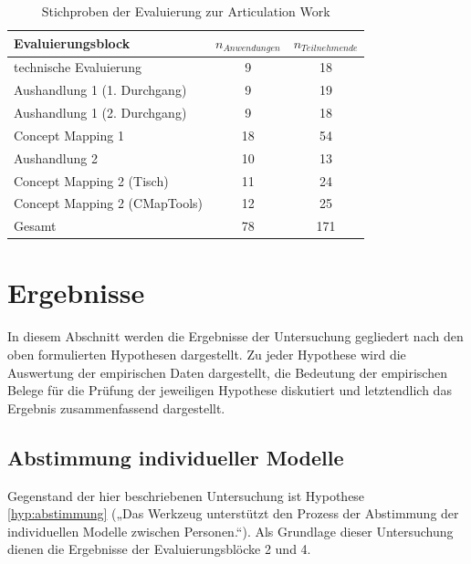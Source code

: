 \begin{table}[htbp]
	\centering
	\caption{Stichproben der Evaluierung zur Articulation Work}

		\begin{tabular}{| l || c | c |}
		\hline
			Evaluierungsblock & $n_{Anwendungen}$ & $n_{Teilnehmende}$ \\ \hline
			technische Evaluierung		  &  9 & 18 \\
			Aushandlung 1 (1. Durchgang)  &  9 & 19 \\
			Aushandlung 1 (2. Durchgang)  &  9 & 18 \\
			Concept Mapping 1			  & 18 & 54 \\
			Aushandlung 2				  & 10 & 13 \\
			Concept Mapping 2 (Tisch)     & 11 & 24 \\
			Concept Mapping 2 (CMapTools) & 12 & 25 \\ \hline
			Gesamt						  & 78 & 171 \\ \hline
	\end{tabular}
	\label{tab:stichprobe_aw}
\end{table}


\section{Ergebnisse} %
\label{sec:a_ergebnisse}

In diesem Abschnitt werden die Ergebnisse der Untersuchung gegliedert nach den oben formulierten Hypothesen dargestellt. Zu jeder Hypothese wird die Auswertung der empirischen Daten dargestellt, die Bedeutung der empirischen Belege für die Prüfung der jeweiligen Hypothese diskutiert und letztendlich das Ergebnis zusammenfassend dargestellt.  

\subsection{Abstimmung individueller Modelle} %
\label{sub:abstimmung_individueller_modelle}

Gegenstand der hier beschriebenen Untersuchung ist Hypothese \ref{hyp:abstimmung} („Das Werkzeug unterstützt den Prozess der Abstimmung der individuellen Modelle zwischen Personen.“). Als Grundlage dieser Untersuchung dienen die Ergebnisse der Evaluierungsblöcke 2 und 4.


